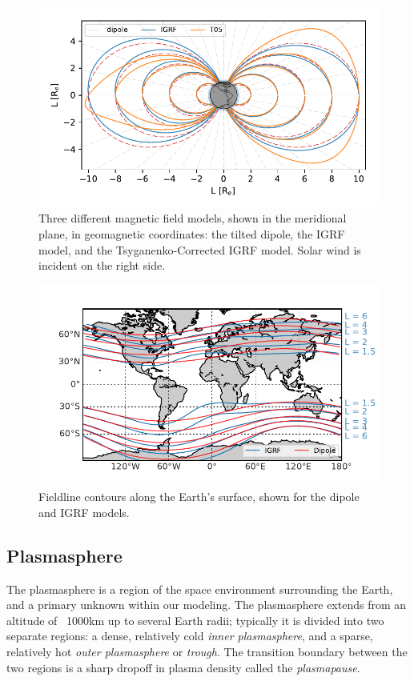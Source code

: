 \begin{figure}[h]
\begin{center}
\includegraphics{figures/fieldline_models.pdf}
\end{center}

\caption[Magnetic field models]{Three different magnetic field models, shown in the meridional plane, in geomagnetic coordinates: the tilted dipole, the IGRF model, and the Tsyganenko-Corrected IGRF model. Solar wind is incident on the right side.}
\label{fig:fieldline_example}
\end{figure}
\begin{figure}[h]
\begin{center}
	\includegraphics{figures/Lshell_contours.pdf}
\end{center}
\caption[L-shell contours on the Earth's surface]{Fieldline contours along the Earth's surface, shown for the dipole and IGRF models.}
\label{fig:Lshell_example}
\end{figure}


\subsection{Plasmasphere}
The plasmasphere is a region of the space environment surrounding the Earth, and a primary unknown within our modeling. The plasmasphere extends from an altitude of ~1000km up to several Earth radii; typically it is divided into two separate regions: a dense, relatively cold \emph{inner plasmasphere}, and a sparse, relatively hot \emph{outer plasmasphere} or \emph{trough}. The transition boundary between the two regions is a sharp dropoff in plasma density called the \emph{plasmapause}.

